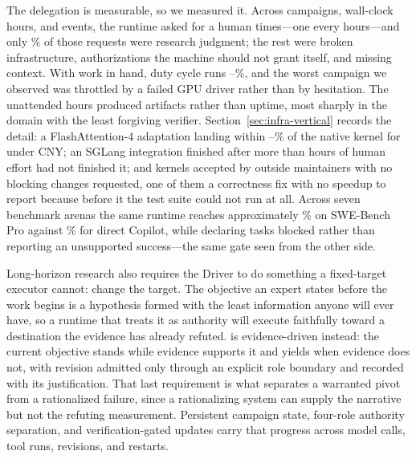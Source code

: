The delegation is measurable, so we measured it. Across \DutyCampaigns{} campaigns,
\DutyWallHours{} wall-clock hours, and \DutyEvents{} events, the runtime asked for a
human \DutyInterruptions{} times---one every \DutyInterval{} hours---and only
\DutyJudgmentPercent\% of those requests were research judgment; the rest were broken
infrastructure, authorizations the machine should not grant itself, and missing
context. With work in hand, duty cycle runs \DutyCycleLow--\DutyCycleHigh\%, and the
worst campaign we observed was throttled by a failed GPU driver rather than by
hesitation. The unattended hours produced artifacts rather than uptime, most sharply in the
domain with the least forgiving verifier. Section~\ref{sec:infra-vertical} records
the detail: a FlashAttention-4 adaptation landing within
\FlashDAGapLow--\FlashDAGapHigh\% of the native kernel for under
\FlashDACostCNY{} CNY; an SGLang integration finished after more than
\SGLangHumanHours{} hours of human effort had not finished it; and \FLAPRTotal{}
kernels accepted by outside maintainers with no blocking changes requested, one of
them a correctness fix with no speedup to report because before it the test suite
could not run at all. Across seven benchmark arenas the same runtime reaches
approximately \SWEProArgusAccuracy\% on SWE-Bench Pro against
\SWEProDirectAccuracy\% for direct Copilot, while declaring \ReviewerFirstBlocked{}
tasks blocked rather than reporting an unsupported success---the same gate seen from
the other side.

Long-horizon research also requires the Driver to do something a fixed-target executor
cannot: change the target. The objective an expert states before the work begins is a
hypothesis formed with the least information anyone will ever have, so a runtime that
treats it as authority will execute faithfully toward a destination the evidence has
already refuted. \systemname{} is evidence-driven instead: the current objective
stands while evidence supports it and yields when evidence does not, with revision
admitted only through an explicit role boundary and recorded with its justification.
That last requirement is what separates a warranted pivot from a rationalized
failure, since a rationalizing system can supply the narrative but not the refuting
measurement. Persistent campaign state, four-role authority separation, and
verification-gated updates carry that progress across model calls, tool runs,
revisions, and restarts.

